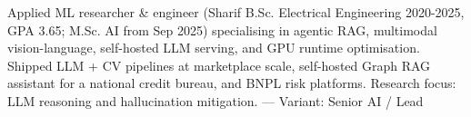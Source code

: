 \small{Applied ML researcher \& engineer (Sharif B.Sc. Electrical Engineering 2020-2025, GPA 3.65; M.Sc. AI from Sep 2025) specialising in agentic RAG, multimodal vision-language, self-hosted LLM serving, and GPU runtime optimisation. Shipped LLM + CV pipelines at marketplace scale, self-hosted Graph RAG assistant for a national credit bureau, and BNPL risk platforms. Research focus: LLM reasoning and hallucination mitigation.
 — Variant: Senior AI / Lead}
